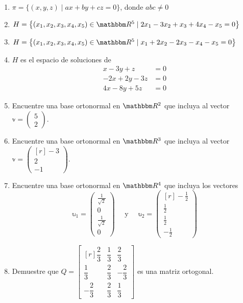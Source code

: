 \begin{enumerate}
    \item $\pi=\{(x, y, z) \mid a x+b y+c z=0\}$, donde $a b c \neq 0$
    \item $H=\left\{\left(x_{1}, x_{2}, x_{3}, x_{4}, x_{5}\right) \in \RR[5] \mid 2 x_{1}-3 x_{2}+x_{3}+4 x_{4}-x_{5}=0\right\}$
    \item $H=\left\{\left(x_{1}, x_{2}, x_{3}, x_{4}, x_{5}\right) \in \RR[5] \mid x_{1}+2 x_{2}-2 x_{3}-x_{4}-x_{5}=0\right\}$
    \item $H$ es el espacio de soluciones de
    \begin{align*}
        x-3 y+z & = 0 \\
        -2 x+2 y-3 z & = 0 \\
        4 x-8 y+5 z & = 0
    \end{align*}
    \item Encuentre una base ortonormal en $\RR[2]$ que incluya al vector $\mathbb{v}=\begin{pmatrix*}5 \\ 2\end{pmatrix*}$.
    \item Encuentre una base ortonormal en $\RR[3]$ que incluya al vector $\mathbb{v}=\begin{pmatrix*}[r]-3 \\ 2 \\ -1\end{pmatrix*}$.
    \item Encuentre una base ortonormal en $\RR[4]$ que incluya los vectores
    $$\mathbb{u}_{1}=\begin{pmatrix*}
        \displaystyle\frac{1}{\sqrt{2}} \\[3mm]
        0 \\
        \displaystyle\frac{1}{\sqrt{2}} \\[3mm]
        0
    \end{pmatrix*} \quad \text{ y } \quad \mathbb{u}_{2}=\begin{pmatrix*}[r]
        \displaystyle-\frac{1}{2} \\[3mm]
        \displaystyle\frac{1}{2} \\[3mm]
        \displaystyle\frac{1}{2} \\[3mm]
        \displaystyle-\frac{1}{2}
    \end{pmatrix*}$$\newpage
    \item Demuestre que $Q=\begin{bmatrix*}[r] \dfrac{2}{3} & \dfrac{1}{3} & \dfrac{2}{3} \\[2mm] \dfrac{1}{3} & \dfrac{2}{3} & -\dfrac{2}{3} \\[2mm] -\dfrac{2}{3} & \dfrac{2}{3} & \dfrac{1}{3} \end{bmatrix*}$ es una matriz ortogonal.

\end{enumerate}
